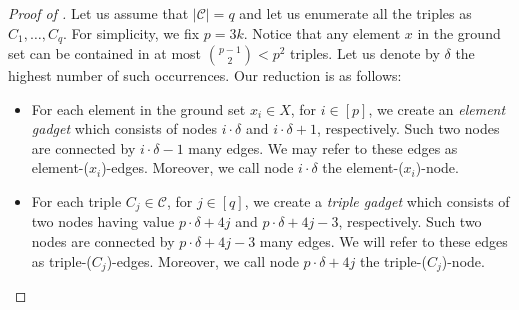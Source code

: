 \documentclass[a4paper,UKenglish,cleveref, autoref, thm-restate]{lipics-v2021}
\newcommand{\modulus}[1]{\vert #1 \vert}
\begin{document}
\begin{proof}[Proof of ]
Let us assume that $\modulus{\mathcal{C}}= q$ and let us enumerate all the triples as $C_1, \dots, C_q$. For simplicity, we fix  $p=3k$. Notice that any element $x$ in the ground set can be contained in at most ${p-1 \choose 2} < p^2$ triples. Let us denote by $\delta$ the highest number of such occurrences. Our reduction is as follows:
%
\begin{itemize}
    \item For each element in the ground set $x_i\in X$, for $i\in [p]$, we create an \emph{element gadget} which consists of nodes $i\cdot \delta$ and $i\cdot\delta +1$, respectively. Such two nodes are connected by $i\cdot\delta -1 $ many edges. We may refer to these edges as element-($x_i$)-edges. Moreover, we call node $i\cdot\delta$ the element-($x_i$)-node.

    \item For each triple $C_j \in \mathcal{C}$, for $j\in [q]$, we create a \emph{triple gadget} which consists of two nodes having value $p\cdot\delta + 4j$  and $p\cdot\delta + 4j -3$, respectively. Such two nodes are connected by $p\cdot\delta + 4j -3$ many edges. We will refer to these edges as triple-($C_j$)-edges. Moreover, we call node $p\cdot\delta + 4j$ the triple-($C_j$)-node.


\end{itemize}
\end{proof}
\end{document}
